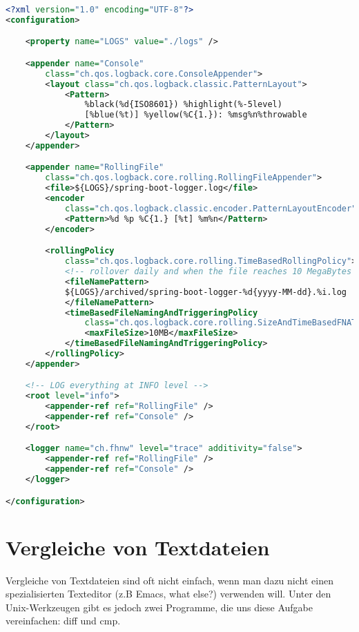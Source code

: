\begin{lstlisting}[language=xml]
<?xml version="1.0" encoding="UTF-8"?>
<configuration>

    <property name="LOGS" value="./logs" />

    <appender name="Console"
        class="ch.qos.logback.core.ConsoleAppender">
        <layout class="ch.qos.logback.classic.PatternLayout">
            <Pattern>
                %black(%d{ISO8601}) %highlight(%-5level)
                [%blue(%t)] %yellow(%C{1.}): %msg%n%throwable
            </Pattern>
        </layout>
    </appender>

    <appender name="RollingFile"
        class="ch.qos.logback.core.rolling.RollingFileAppender">
        <file>${LOGS}/spring-boot-logger.log</file>
        <encoder
            class="ch.qos.logback.classic.encoder.PatternLayoutEncoder">
            <Pattern>%d %p %C{1.} [%t] %m%n</Pattern>
        </encoder>

        <rollingPolicy
            class="ch.qos.logback.core.rolling.TimeBasedRollingPolicy">
            <!-- rollover daily and when the file reaches 10 MegaBytes -->
            <fileNamePattern>
            ${LOGS}/archived/spring-boot-logger-%d{yyyy-MM-dd}.%i.log
            </fileNamePattern>
            <timeBasedFileNamingAndTriggeringPolicy
                class="ch.qos.logback.core.rolling.SizeAndTimeBasedFNATP">
                <maxFileSize>10MB</maxFileSize>
            </timeBasedFileNamingAndTriggeringPolicy>
        </rollingPolicy>
    </appender>

    <!-- LOG everything at INFO level -->
    <root level="info">
        <appender-ref ref="RollingFile" />
        <appender-ref ref="Console" />
    </root>

    <logger name="ch.fhnw" level="trace" additivity="false">
        <appender-ref ref="RollingFile" />
        <appender-ref ref="Console" />
    </logger>

</configuration>
\end{lstlisting}

%
\newslide
\section{Vergleiche von Textdateien}
Vergleiche von Textdateien sind oft nicht einfach, wenn man dazu
nicht einen spezialisierten Texteditor (z.B Emacs, what else?) verwenden will.
Unter den Unix-Werkzeugen gibt es jedoch zwei Programme, die
uns diese Aufgabe vereinfachen: diff und cmp.

